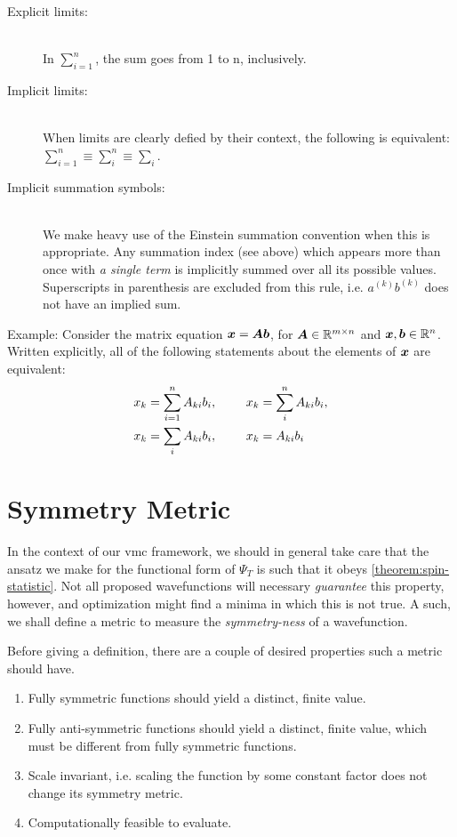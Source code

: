 \documentclass[Thesis.tex]{subfiles}
\begin{document}
\begin{description}
\item[Explicit limits:] \hfill\\
  In $\sum_{i=1}^n$, the sum goes from 1 to n, inclusively.
\item[Implicit limits:]\hfill\\
  When limits are clearly defied by their context, the following is equivalent:
  $\sum_{i=1}^n \equiv \sum_{i}^n\equiv \sum_i$.
\item[Implicit summation symbols:]\hfill\\
  We make heavy use of the Einstein summation convention when this is
  appropriate. Any summation index (see above) which appears more than once with
  \emph{a single term} is implicitly summed over all its possible values.
  Superscripts in parenthesis are excluded from this rule, i.e. $a^{(k)}b^{(k)}$
  does not have an implied sum.
\end{description}

Example: Consider the matrix equation $\bm{x} = \bm{A}\bm{b}$, for
$\bm{A}\in\mathbb{R}^{m\times n}$ and $\bm{x}, \bm{b} \in \mathbb{R}^n$. Written
explicitly, all of the following statements about the elements of $\bm{x}$ are equivalent:
\begin{align}
  \begin{split}
  x_k &= \sum_{i=1}^n A_{ki}b_i,\qq{ } x_k = \sum_{i}^n A_{ki}b_i,\\
  x_k &= \sum_{i} A_{ki}b_i,\qq{ } x_k = A_{ki}b_i
  \end{split}
\end{align}

\section{Symmetry Metric}
\label{app:symmetry-metric}

In the context of our \gls{vmc} framework, we should in general
take care that the ansatz we make for the functional form of $\Psi_T$ is such
that it obeys \autoref{theorem:spin-statistic}. Not all proposed wavefunctions
will necessary \emph{guarantee} this property, however, and optimization might
find a minima in which this is not true. A such, we shall define a metric to
measure the \emph{symmetry-ness} of a wavefunction.

Before giving a definition, there are a couple of desired properties such a
metric should have.

\begin{enumerate}
    \item Fully symmetric functions should yield a distinct, finite value.
    \item Fully anti-symmetric functions should yield a distinct, finite value,
        which must be different from fully symmetric functions.
    \item Scale invariant, i.e. scaling the function by
        some constant factor does not change its symmetry metric.
    \item Computationally feasible to evaluate.
\end{enumerate}
\end{document}
